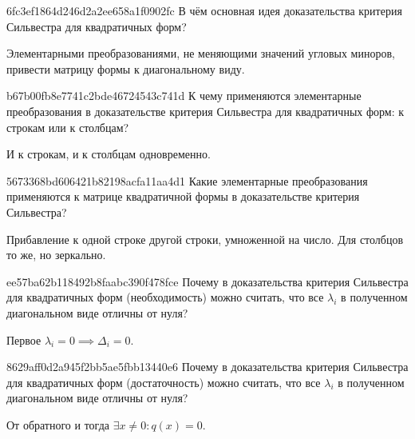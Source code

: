 \begin{note}{6fc3ef1864d246d2a2ee658a1f0902fc}
    В чём основная идея доказательства критерия Сильвестра для квадратичных форм?

    \begin{cloze}{1}
        Элементарными преобразованиями, не меняющими значений угловых миноров, привести матрицу формы к диагональному виду.
    \end{cloze}
\end{note}

\begin{note}{b67b00fb8e7741c2bde46724543c741d}
    К чему применяются элементарные преобразования в доказательстве критерия Сильвестра для квадратичных форм: к строкам или к столбцам?

    \begin{cloze}{1}
        И к строкам, и к столбцам одновременно.
    \end{cloze}
\end{note}

\begin{note}{5673368bd606421b82198acfa11aa4d1}
    Какие элементарные преобразования применяются к матрице квадратичной формы в доказательстве критерия Сильвестра?

    \begin{cloze}{1}
        Прибавление к одной строке другой строки, умноженной на число. Для столбцов то же, но зеркально.
    \end{cloze}
\end{note}

\begin{note}{ee57ba62b118492b8faabc390f478fce}
    Почему в доказательства критерия Сильвестра для квадратичных форм (необходимость) можно считать, что все \({ \lambda_i }\) в полученном диагональном виде отличны от нуля?

    \begin{cloze}{1}
        Первое \({ \lambda_i = 0 \implies \Delta_i = 0 }\).
    \end{cloze}
\end{note}

\begin{note}{8629aff0d2a945f2bb5ae5fbb13440e6}
    Почему в доказательства критерия Сильвестра для квадратичных форм (достаточность) можно считать, что все \({ \lambda_i }\) в полученном диагональном виде отличны от нуля?

    \begin{cloze}{1}
        От обратного и тогда \({ \exists x \neq 0 : q(x) = 0 }\).
    \end{cloze}
\end{note}

